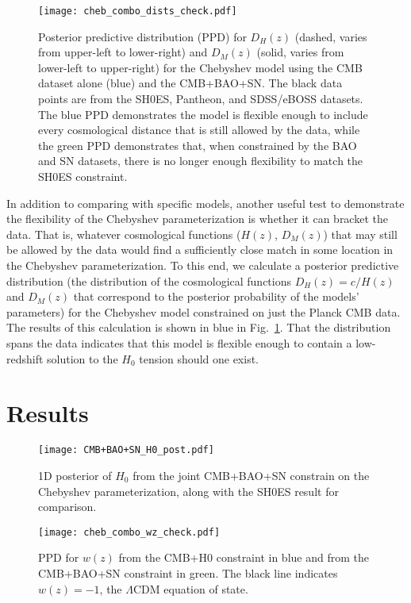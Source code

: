 \documentclass[
 reprint,
 amsmath,amssymb,
 aps,
]{revtex4-2}
\begin{document}
\begin{figure}
    \centering
    \texttt{[image: cheb\_combo\_dists\_check.pdf]}
    \caption{Posterior predictive distribution (PPD) for $D_H(z)$ (dashed, varies from upper-left to lower-right) and $D_M(z)$ (solid, varies from lower-left to upper-right) for the Chebyshev model using the CMB dataset alone (blue) and the CMB+BAO+SN. The black data points are from the SH0ES, Pantheon, and SDSS/eBOSS datasets. The blue PPD demonstrates the model is flexible enough to include every cosmological distance that is still allowed by the data, while the green PPD demonstrates that, when constrained by the BAO and SN datasets, there is no longer enough flexibility to match the SH0ES constraint.}
    \label{fig:prior}
\end{figure}

In addition to comparing with specific models, another useful test to demonstrate the flexibility of the Chebyshev parameterization is whether it can bracket the data.  That is, whatever cosmological functions ($H(z)$, $D_M(z)$) that may still be allowed by the data would find a sufficiently close match in some location in the Chebyshev parameterization.  To this end, we calculate a posterior predictive distribution (the distribution of the cosmological functions $D_H(z) = c/H(z)$ and $D_M(z)$ that correspond to the posterior probability of the models' parameters) for the Chebyshev model constrained on just the Planck CMB data. The results of this calculation is shown in blue in Fig.~\ref{fig:prior}.  That the distribution spans the data indicates that this model is flexible enough to contain a low-redshift solution to the $H_0$ tension should one exist. 

\section{Results}

\begin{figure}
    \centering
    \texttt{[image: CMB+BAO+SN\_H0\_post.pdf]}
    \caption{1D posterior of $H_0$ from the joint CMB+BAO+SN constrain on the Chebyshev parameterization, along with the SH0ES result for comparison.}
    \label{fig:H0}
\end{figure}

\begin{figure}
    \centering
    \texttt{[image: cheb\_combo\_wz\_check.pdf]}
    \caption{PPD for $w(z)$ from the CMB+H0 constraint in blue and from the CMB+BAO+SN constraint in green. The black line indicates $w(z)=-1$, the $\Lambda$CDM equation of state.}
    \label{fig:w_z}
\end{figure}
\end{document}
